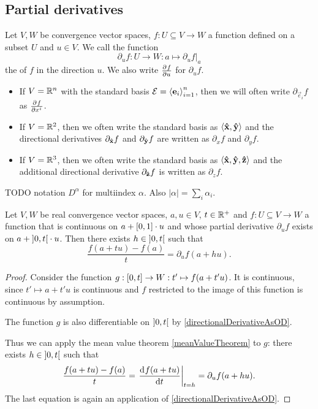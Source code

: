 \subsection{Partial derivatives}
\begin{definition}
Let $V,W$ be convergence vector spaces, $f:U\subseteq V\to W$ a function defined on a subset $U$ and $u\in V$.
We call the function
\[ \partial_u f: U\to W: a\mapsto \partial_u f|_a \]
the  of $f$ in the direction $u$. We also write $ \frac{\partial{^{}}f}{\partial{{u}^{}}} $ for $\partial_u f$.
\begin{itemize}
\item If $V = \mathbb{R}^n$ with the standard basis $\mathcal{E} = \left\langle \boldsymbol{\mathrm{e}}_i \right\rangle_{i=1}^n$, then we will often write $\partial_{\vec{e}_i}f$ as $ \frac{\partial{^{}}f}{\partial{{x^i}^{}}} $.
\item If $V = \mathbb{R}^2$, then we often write the standard basis as $\left\langle \boldsymbol{\mathrm{\hat{x}}}, \boldsymbol{\mathrm{\hat{y}}} \right\rangle$ and the directional derivatives $\partial_{\boldsymbol{\mathrm{\hat{x}}}}f$ and $\partial_{\boldsymbol{\mathrm{\hat{y}}}}f$ are written as $\partial_{x}f$ and $\partial_{y}f$.
\item If $V = \mathbb{R}^3$, then we often write the standard basis as $\left\langle \boldsymbol{\mathrm{\hat{x}}}, \boldsymbol{\mathrm{\hat{y}}}, \boldsymbol{\mathrm{\hat{z}}} \right\rangle$ and the additional directional derivative $\partial_{\boldsymbol{\mathrm{\hat{z}}}}f$ is written as $\partial_{z}f$.
\end{itemize}
\end{definition}
TODO notation $D^\alpha$ for multiindex $\alpha$. Also $|\alpha| = \sum_i \alpha_i$.

\begin{lemma} \label{partialDerivativeMeanValueTheorem}
Let $V,W$ be real convergence vector spaces, $a,u\in V$, $t\in\mathbb{R}^+$ and $f: U\subseteq V\to W$ a function that is continuous on $a+\interval{0,1}\cdot u$ and whose partial derivative $\partial_u f$ exists on $a+\interval[o]{0,t}\cdot u$. Then there exists $h\in \interval[o]{0,t}$ such that
\[ \frac{f(a+tu) - f(a)}{t} = \partial_u f(a+hu). \]
\end{lemma}
\begin{proof}
Consider the function $g: \interval{0,t} \to W: t'\mapsto f(a+t'u)$. It is continuous, since $t'\mapsto a+t'u$ is continuous and $f$ restricted to the image of this function is continuous by assumption.

The function $g$ is also differentiable on $\interval[o]{0,t}$ by \ref{directionalDerivativeAsOD}.

Thus we can apply the mean value theorem \ref{meanValueTheorem} to $g$: there exists $h\in \interval[o]{0,t}$ such that
\[ \frac{f(a+tu) - f(a)}{t} = \left.\mathinner{ \dfrac{\operatorname{d \!}{^{}}f(a+tu)}{\operatorname{d \!}{{t}^{}}} }\right|_{t=h} = \partial_u f(a+hu). \]
The last equation is again an application of \ref{directionalDerivativeAsOD}.
\end{proof}



